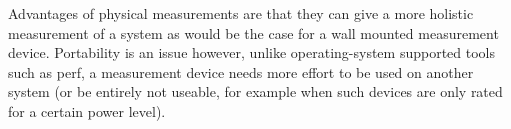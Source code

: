 Advantages of physical measurements are that they can give a more holistic measurement of a system as would be the case for a wall mounted measurement device. 
Portability is an issue however, unlike operating-system supported tools such as perf, a measurement device needs more effort to be used on another system (or be entirely not useable, for example when such devices are only rated for a certain power level).


